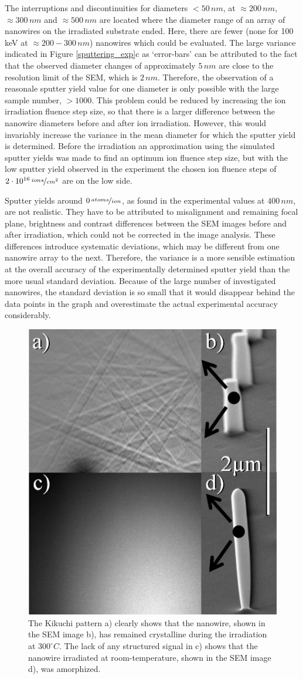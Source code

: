 The interruptions and discontinuities for diameters $<50\,nm$, at $\approx 200\,nm$, $\approx 300\,nm$ and $\approx 500\,nm$ are located where the diameter range of an array of nanowires on the irradiated substrate ended. Here, there are fewer (none for 100\,keV at $\approx 200 - 300\,nm$) nanowires which could be evaluated. The large variance indicated in Figure \ref{sputtering_exp}c as `error-bars' can be attributed to the fact that the observed diameter changes of approximately $5\,nm$ are close to the resolution limit of the SEM, which is $2\,nm$. Therefore, the observation of a reasonale sputter yield value for one diameter is only possible with the large sample number, $>1000$. This problem could be reduced by increasing the ion irradiation fluence step size, so that there is a larger difference between the nanowire diameters before and after ion irradiation. However, this would invariably increase the variance in the mean diameter for which the sputter yield is determined. Before the irradiation an approximation using the simulated sputter yields was made to find an optimum ion fluence step size, but with the low sputter yield observed in the experiment the chosen ion fluence steps of $2\cdot10^{16}\,\nicefrac{ions}{cm^2}$ are on the low side.

Sputter yields around $0\,\nicefrac{atoms}{ion}$, as found in the experimental values at $400\,nm$, are not realistic. They have to be attributed to misalignment and remaining focal plane, brightness and contrast differences between the SEM images before and after irradiation, which could not be corrected in the image analysis. These differences introduce systematic deviations, which may be different from one nanowire array to the next. Therefore, the variance is a more sensible estimation at the overall accuracy of the experimentally determined sputter yield than the more usual standard deviation. Because of the large number of investigated nanowires, the standard deviation is so small that it would disappear behind the data points in the graph and overestimate the actual experimental accuracy considerably.

\begin{figure}
	\centering
		\includegraphics[width=.35\textwidth]{images/EBSD.jpg}
	\caption{The Kikuchi pattern a) clearly shows that the nanowire, shown in the SEM image b), has remained crystalline during the irradiation at $300^\circ C$. The lack of any structured signal in c) shows that the nanowire irradiated at room-temperature, shown in the SEM image d), was amorphized.} 
	\label{EBSD}
\end{figure}

